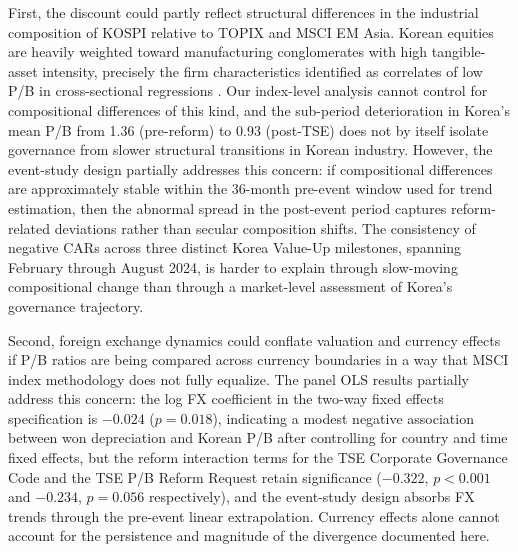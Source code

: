First, the discount could partly reflect structural differences in the industrial composition of KOSPI relative to TOPIX and MSCI EM Asia. Korean equities are heavily weighted toward manufacturing conglomerates with high tangible-asset intensity, precisely the firm characteristics identified as correlates of low P/B in cross-sectional regressions \citep{yang_korea_discount_growth_vs_governance}. Our index-level analysis cannot control for compositional differences of this kind, and the sub-period deterioration in Korea's mean P/B from 1.36 (pre-reform) to 0.93 (post-TSE) does not by itself isolate governance from slower structural transitions in Korean industry. However, the event-study design partially addresses this concern: if compositional differences are approximately stable within the 36-month pre-event window used for trend estimation, then the abnormal spread in the post-event period captures reform-related deviations rather than secular composition shifts. The consistency of negative CARs across three distinct Korea Value-Up milestones, spanning February through August 2024, is harder to explain through slow-moving compositional change than through a market-level assessment of Korea's governance trajectory.

Second, foreign exchange dynamics could conflate valuation and currency effects if P/B ratios are being compared across currency boundaries in a way that MSCI index methodology does not fully equalize. The panel OLS results partially address this concern: the log FX coefficient in the two-way fixed effects specification is $-0.024$ ($p = 0.018$), indicating a modest negative association between won depreciation and Korean P/B after controlling for country and time fixed effects, but the reform interaction terms for the TSE Corporate Governance Code and the TSE P/B Reform Request retain significance ($-0.322$, $p < 0.001$ and $-0.234$, $p = 0.056$ respectively), and the event-study design absorbs FX trends through the pre-event linear extrapolation. Currency effects alone cannot account for the persistence and magnitude of the divergence documented here.

